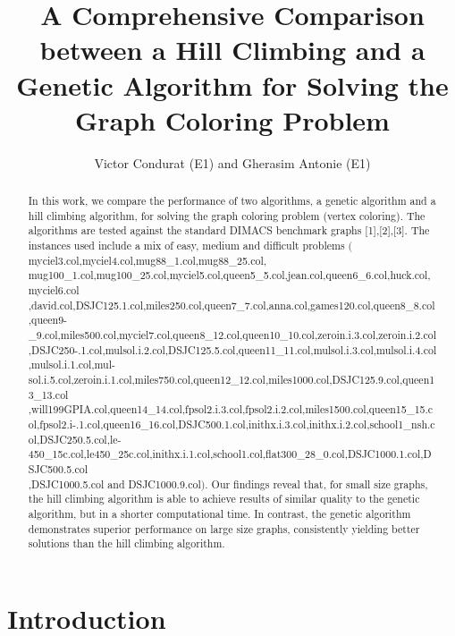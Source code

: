 \documentclass[10pt]{article}
\author{Victor Condurat (E1) and Gherasim Antonie (E1)}
\title{A Comprehensive Comparison between a Hill Climbing and a Genetic Algorithm for Solving the Graph Coloring Problem}
\date{}
\begin{document}
\maketitle
\begin{abstract}
In this work, we compare the performance of two algorithms, a genetic algorithm and a hill climbing algorithm, for solving the graph coloring problem (vertex coloring). The algorithms are tested against the standard DIMACS benchmark graphs [1],[2],[3]. The instances used include a mix of easy, medium and difficult problems $($myciel3.col,myciel4.col,mug88\_1.col,mug88\_25.col,\\mug100\_1.col,mug100\_25.col,myciel5.col,queen5\_5.col,jean.col,queen6\_6.col,huck.col,myciel6.col\\,david.col,DSJC125.1.col,miles250.col,queen7\_7.col,anna.col,games120.col,queen8\_8.col,queen9- \_9.col,miles500.col,myciel7.col,queen8\_12.col,queen10\_10.col,zeroin.i.3.col,zeroin.i.2.col,DSJC250-.1.col,mulsol.i.2.col,DSJC125.5.col,queen11\_11.col,mulsol.i.3.col,mulsol.i.4.col,mulsol.i.1.col,mul-sol.i.5.col,zeroin.i.1.col,miles750.col,queen12\_12.col,miles1000.col,DSJC125.9.col,queen13\_13.col\\,will199GPIA.col,queen14\_14.col,fpsol2.i.3.col,fpsol2.i.2.col,miles1500.col,queen15\_15.col,fpsol2.i-.1.col,queen16\_16.col,DSJC500.1.col,inithx.i.3.col,inithx.i.2.col,school1\_nsh.col,DSJC250.5.col,le-450\_15c.col,le450\_25c.col,inithx.i.1.col,school1.col,flat300\_28\_0.col,DSJC1000.1.col,DSJC500.5.col\\,DSJC1000.5.col and DSJC1000.9.col$)$. Our findings reveal that, for small size graphs, the hill climbing algorithm is able to achieve results of similar quality to the genetic algorithm, but in a shorter computational time. In contrast, the genetic algorithm demonstrates superior performance on large size graphs, consistently yielding better solutions than the hill climbing algorithm.
\end{abstract}

\section{Introduction}
\end{document}
